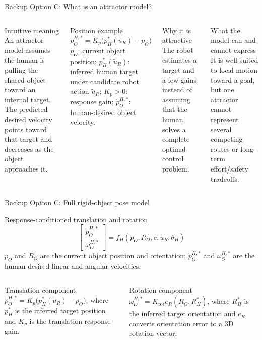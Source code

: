 \documentclass[aspectratio=169,11pt]{beamer}
\begin{document}
\begin{frame}{Backup Option C: What is an attractor model?}
\begin{columns}[T,onlytextwidth]
\begin{block}{Intuitive meaning}
An attractor model assumes the human is pulling the shared object toward an internal target. The predicted desired velocity points toward that target and decreases as the object approaches it.
\end{block}
\begin{block}{Position example}
\[
\dot p_O^{H,*}=K_p\bigl(p_H^*(\tilde u_R)-p_O\bigr)
\]
$p_O$: current object position; $p_H^*(\tilde u_R)$: inferred human target under candidate robot action $\tilde u_R$; $K_p>0$: response gain; $\dot p_O^{H,*}$: human-desired object velocity.
\end{block}
\begin{exampleblock}{Why it is attractive}
The robot estimates a target and a few gains instead of assuming that the human solves a complete optimal-control problem.
\end{exampleblock}
\begin{alertblock}{What the model can and cannot express}
It is well suited to local motion toward a goal, but one attractor cannot represent several competing routes or long-term effort/safety tradeoffs.
\end{alertblock}
\end{columns}
\end{frame}

\begin{frame}{Backup Option C: Full rigid-object pose model}
\begin{block}{Response-conditioned translation and rotation}
\[
\begin{bmatrix}\dot p_O^{H,*}\\[2pt]\omega_O^{H,*}\end{bmatrix}
=f_H(p_O,R_O,c,\tilde u_R;\theta_H)
\]
$p_O$ and $R_O$ are the current object position and orientation; $\dot p_O^{H,*}$ and $\omega_O^{H,*}$ are the human-desired linear and angular velocities.
\end{block}
\begin{columns}[T,onlytextwidth]
\begin{block}{Translation component}
$\dot p_O^{H,*}=K_p\bigl(p_H^*(\tilde u_R)-p_O\bigr)$, where $p_H^*$ is the inferred target position and $K_p$ is the translation response gain.
\end{block}
\begin{block}{Rotation component}
$\omega_O^{H,*}=K_{\mathrm{rot}}e_R(R_O,R_H^*)$, where $R_H^*$ is the inferred target orientation and $e_R$ converts orientation error to a 3D rotation vector.
\end{block}
\end{columns}
\end{frame}
\end{document}
